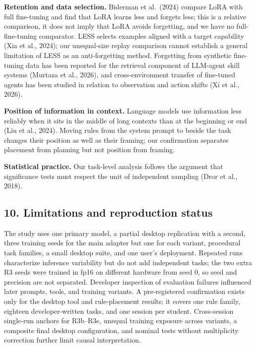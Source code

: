 \documentclass[
  10pt,
]{article}
\begin{document}
\textbf{Retention and data selection.} Biderman et al.~(2024) compare
LoRA with full fine-tuning and find that LoRA learns less and forgets
less; this is a relative comparison, it does not imply that LoRA avoids
forgetting, and we have no full-fine-tuning comparator. LESS selects
examples aligned with a target capability (Xia et al., 2024); our
unequal-size replay comparison cannot establish a general limitation of
LESS as an anti-forgetting method. Forgetting from synthetic fine-tuning
data has been reported for the retrieval component of LLM-agent skill
systems (Murtaza et al., 2026), and cross-environment transfer of
fine-tuned agents has been studied in relation to observation and action
shifts (Xi et al., 2026).

\textbf{Position of information in context.} Language models use
information less reliably when it sits in the middle of long contexts
than at the beginning or end (Liu et al., 2024). Moving rules from the
system prompt to beside the task changes their position as well as their
framing; our confirmation separates placement from planning but not
position from framing.

\textbf{Statistical practice.} Our task-level analysis follows the
argument that significance tests must respect the unit of independent
sampling (Dror et al., 2018).

\subsection{10. Limitations and reproduction
status}\label{limitations-and-reproduction-status}

The study uses one primary model, a partial desktop replication with a
second, three training seeds for the main adapter but one for each
variant, procedural task families, a small desktop suite, and one user's
deployment. Repeated runs characterize inference variability but do not
add independent tasks; the two extra R3 seeds were trained in fp16 on
different hardware from seed 0, so seed and precision are not separated.
Developer inspection of evaluation failures influenced later prompts,
tools, and training variants. A pre-registered confirmation exists only
for the desktop tool and rule-placement results; it covers one rule
family, eighteen developer-written tasks, and one session per student.
Cross-session single-run anchors for R3b--R3e, unequal training exposure
across variants, a composite final desktop configuration, and nominal
tests without multiplicity correction further limit causal
interpretation.
\end{document}
